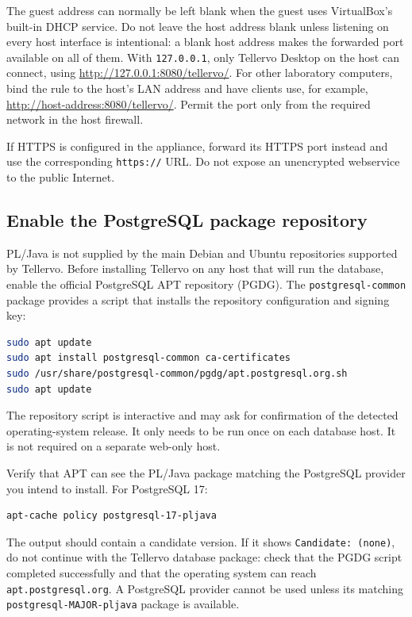 \begin{description}
 The guest address can normally be left blank when the guest uses VirtualBox's
 built-in DHCP service. Do not leave the host address blank unless listening on
 every host interface is intentional: a blank host address makes the forwarded
 port available on all of them. With \verb|127.0.0.1|, only Tellervo Desktop on
 the host can connect, using
 \url{http://127.0.0.1:8080/tellervo/}. For other laboratory computers, bind the
 rule to the host's LAN address and have clients use, for example,
 \url{http://host-address:8080/tellervo/}. Permit the port only from the required
 network in the host firewall.

 If HTTPS is configured in the appliance, forward its HTTPS port instead and
 use the corresponding \verb|https://| URL. Do not expose an unencrypted
 webservice to the public Internet.
\end{description}

\subsection{Enable the PostgreSQL package repository}

PL/Java is not supplied by the main Debian and Ubuntu repositories supported
by Tellervo. Before installing Tellervo on any host that will run the database,
enable the official PostgreSQL APT repository (PGDG). The
\verb|postgresql-common| package provides a script that installs the repository
configuration and signing key:

\begin{lstlisting}[language=bash]
sudo apt update
sudo apt install postgresql-common ca-certificates
sudo /usr/share/postgresql-common/pgdg/apt.postgresql.org.sh
sudo apt update
\end{lstlisting}

The repository script is interactive and may ask for confirmation of the
detected operating-system release. It only needs to be run once on each
database host. It is not required on a separate web-only host.

Verify that APT can see the PL/Java package matching the PostgreSQL provider
you intend to install. For PostgreSQL 17:

\begin{lstlisting}[language=bash]
apt-cache policy postgresql-17-pljava
\end{lstlisting}

The output should contain a candidate version. If it shows
\verb|Candidate: (none)|, do not continue with the Tellervo database package:
check that the PGDG script completed successfully and that the operating
system can reach \verb|apt.postgresql.org|. A PostgreSQL provider cannot be
used unless its matching \verb|postgresql-MAJOR-pljava| package is available.

